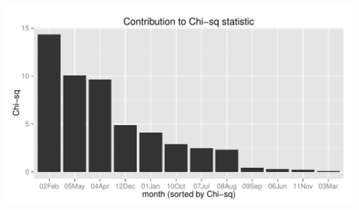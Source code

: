 \documentclass{article}\usepackage[]{graphicx}\usepackage[]{color}
\makeatletter
\def\maxwidth{ %
  \ifdim\Gin@nat@width>\linewidth
    \linewidth
  \else
    \Gin@nat@width
  \fi
}
\newenvironment{knitrout}{}{} %
\makeatother
\begin{document}
\begin{knitrout}
{\centering \includegraphics[width=\maxwidth]{figure/3_plot-2} 

}



\end{knitrout}
\end{document}
